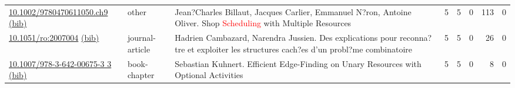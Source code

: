 {\begin{longtable}{p{5cm}lp{11cm}rrrrr}
\href{http://dx.doi.org/10.1002/9780470611050.ch9}{10.1002/9780470611050.ch9} \href{https://www.doi2bib.org/bib/10.1002/9780470611050.ch9}{(bib)} & other & Jean?Charles Billaut, Jacques Carlier, Emmanuel N?ron, Antoine Oliver. Shop \textcolor{red}{Scheduling} with Multiple Resources & 5 & 5 & 0 & 113 & 0 \\
\href{http://dx.doi.org/10.1051/ro:2007004}{10.1051/ro:2007004} \href{https://www.doi2bib.org/bib/10.1051/ro:2007004}{(bib)} & journal-article & Hadrien Cambazard, Narendra Jussien. Des explications pour reconna?tre et exploiter les structures cach?es d'un probl?me combinatoire & 5 & 5 & 0 & 26 & 0 \\
\href{http://dx.doi.org/10.1007/978-3-642-00675-3_3}{10.1007/978-3-642-00675-3 3} \href{https://www.doi2bib.org/bib/10.1007/978-3-642-00675-3_3}{(bib)} & book-chapter & Sebastian Kuhnert. Efficient Edge-Finding on Unary Resources with Optional Activities & 5 & 5 & 0 & 8 & 0 \\
\end{longtable}
}

